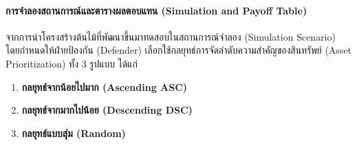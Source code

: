 \paragraph{การจำลองสถานการณ์และตารางผลตอบแทน (Simulation and Payoff Table)}
จากการนำโครงสร้างต้นไม้ที่พัฒนาขึ้นมาทดสอบในสถานการณ์จำลอง (Simulation Scenario) โดยกำหนดให้ฝ่ายป้องกัน (Defender) เลือกใช้กลยุทธ์การจัดลำดับความสำคัญของสินทรัพย์ (Asset Prioritization) ทั้ง 3 รูปแบบ ได้แก่
\begin{enumerate}
    \item \textbf{กลยุทธ์จากน้อยไปมาก (Ascending ASC)}
    \item \textbf{กลยุทธ์จากมากไปน้อย (Descending DSC)}
    \item \textbf{กลยุทธ์แบบสุ่ม (Random)}
\end{enumerate}

